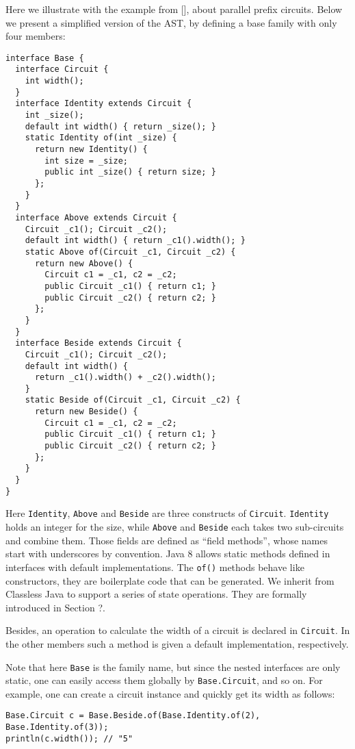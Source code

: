 Here we illustrate with the example from [], about parallel prefix circuits. Below we present a simplified version
of the AST, by defining a base family with only four members:

\begin{lstlisting}
interface Base {
  interface Circuit {
    int width();
  }
  interface Identity extends Circuit {
    int _size();
    default int width() { return _size(); }
    static Identity of(int _size) {
      return new Identity() {
        int size = _size;
        public int _size() { return size; }
      };
    }
  }
  interface Above extends Circuit {
    Circuit _c1(); Circuit _c2();
    default int width() { return _c1().width(); }
    static Above of(Circuit _c1, Circuit _c2) {
      return new Above() {
        Circuit c1 = _c1, c2 = _c2;
        public Circuit _c1() { return c1; }
        public Circuit _c2() { return c2; }
      };
    }
  }
  interface Beside extends Circuit {
    Circuit _c1(); Circuit _c2();
    default int width() {
      return _c1().width() + _c2().width();
    }
    static Beside of(Circuit _c1, Circuit _c2) {
      return new Beside() {
        Circuit c1 = _c1, c2 = _c2;
        public Circuit _c1() { return c1; }
        public Circuit _c2() { return c2; }
      };
    }
  }
}
\end{lstlisting}
Here \lstinline|Identity|, \lstinline|Above| and \lstinline|Beside| are three constructs of \lstinline|Circuit|.
\lstinline|Identity| holds an integer for the size, while \lstinline|Above| and \lstinline|Beside| each takes
two sub-circuits and combine them. Those fields are defined as ``field methods'', whose names
start with underscores by convention. Java 8 allows static methods defined in interfaces with default implementations.
The \lstinline|of()| methods behave like constructors, they are boilerplate code that can be generated. We inherit from
Classless Java to support a series of state operations. They are formally introduced in Section ?.

Besides, an operation to calculate the width of a circuit is declared in \lstinline|Circuit|. In the other members such
a method is given a default implementation, respectively.

Note that here \lstinline|Base| is the family name, but since the nested interfaces are only static, one
can easily access them globally by \lstinline|Base.Circuit|, and so on. For example, one can create a circuit instance and
quickly get its width as follows:
\begin{lstlisting}
Base.Circuit c = Base.Beside.of(Base.Identity.of(2), Base.Identity.of(3));
println(c.width()); // "5"
\end{lstlisting}


